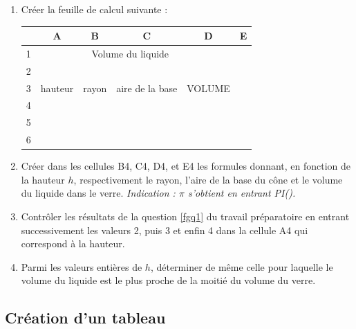 \begin{enumerate}
	\item Cr\'eer la feuille de calcul suivante :
				\begin{center}
				\begin{tabular}{c|c|c|c|c|c}
				 &A&B &C &D &E  \\ \hline
				 1& & \multicolumn{2}{c|}{Volume du liquide} & & \\ \hline
				 2& & & & & \\ \hline
				 3& hauteur & rayon & aire de la base & VOLUME &  \\ \hline
				 4& & & & & \\ \hline
				 5& & & & & \\ \hline
				 6& & & & & \\ \hline
				\end{tabular}
				\end{center}
	\item Cr\'eer dans les cellules B4, C4, D4, et E4 les formules donnant, en fonction de la hauteur $h$, respectivement le rayon, l'aire de la base du cône et le volume du liquide dans le verre. \emph{Indication : $\pi$ s'obtient en entrant PI().}
	\item Contrôler les r\'esultats de la question \ref{fgq1} du travail pr\'eparatoire en entrant successivement les valeurs 2, puis 3 et enfin 4 dans la cellule A4 qui correspond \`a la hauteur.
	\item Parmi les valeurs enti\`eres de $h$, d\'eterminer de même celle pour laquelle le volume du liquide est le plus proche de la moiti\'e du volume du verre.
\end{enumerate}

\subsection{Cr\'eation d'un tableau}


